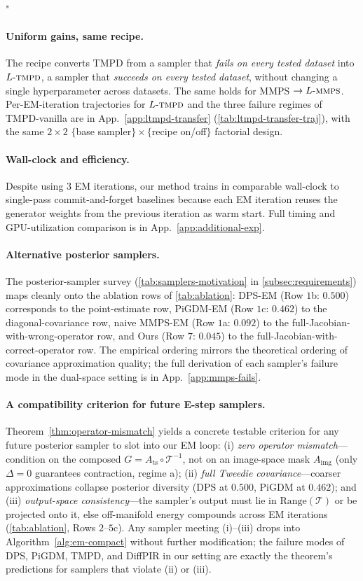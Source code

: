 "\documentclass{article}
\theoremstyle{plain}
\theoremstyle{definition}
\theoremstyle{remark}
\newcommand{\tsimg}{\mathcal{T}}
\newcommand{\imgts}{\mathcal{T}^{-1}}
\newcommand{\lmmps}{L\mbox{-}\textsc{mmps}}
\newcommand{\ltmpd}{L\mbox{-}\textsc{tmpd}}
\newcommand{\Ats}{A_{\mathrm{ts}}}
\newcommand{\Aimg}{A_{\mathrm{img}}}
\begin{document}
\paragraph{Uniform gains, same recipe.}
The recipe converts TMPD from a sampler that \emph{fails on every tested dataset} into $\ltmpd$, a sampler that \emph{succeeds on every tested dataset}, without changing a single hyperparameter across datasets. The same holds for MMPS $\to \lmmps$. Per-EM-iteration trajectories for $\ltmpd$ and the three failure regimes of TMPD-vanilla are in App.~\ref{app:ltmpd-transfer} (\cref{tab:ltmpd-transfer-traj}), with the same $2{\times}2$ $\{$base sampler$\}\times\{$recipe on/off$\}$ factorial design.

\paragraph{Wall-clock and efficiency.}
Despite using $3$ EM iterations, our method trains in comparable wall-clock to single-pass commit-and-forget baselines because each EM iteration reuses the generator weights from the previous iteration as warm start. Full timing and GPU-utilization comparison is in App.~\ref{app:additional-exp}.

\vspace{-1mm}
\paragraph{Alternative posterior samplers.}
The posterior-sampler survey (\cref{tab:samplers-motivation} in \cref{subsec:requirements}) maps cleanly onto the ablation rows of \cref{tab:ablation}: DPS-EM (Row $1$b: $0.500$) corresponds to the point-estimate row, PiGDM-EM (Row $1$c: $0.462$) to the diagonal-covariance row, naive MMPS-EM (Row $1$a: $0.092$) to the full-Jacobian-with-wrong-operator row, and Ours (Row $7$: $0.045$) to the full-Jacobian-with-correct-operator row. The empirical ordering mirrors the theoretical ordering of covariance approximation quality; the full derivation of each sampler's failure mode in the dual-space setting is in App.~\ref{app:mmps-fails}.

\paragraph{A compatibility criterion for future E-step samplers.}
Theorem~\ref{thm:operator-mismatch} yields a concrete testable criterion for any future posterior sampler to slot into our EM loop: (i) \emph{zero operator mismatch}---condition on the composed $G = \Ats \circ \imgts$, not on an image-space mask $\Aimg$ (only $\Delta = 0$ guarantees contraction, regime a); (ii) \emph{full Tweedie covariance}---coarser approximations collapse posterior diversity (DPS at $0.500$, PiGDM at $0.462$); and (iii) \emph{output-space consistency}---the sampler's output must lie in $\mathrm{Range}(\tsimg)$ or be projected onto it, else off-manifold energy compounds across EM iterations (\cref{tab:ablation}, Rows $2$--$5$c). Any sampler meeting (i)--(iii) drops into Algorithm~\ref{alg:em-compact} without further modification; the failure modes of DPS, PiGDM, TMPD, and DiffPIR in our setting are exactly the theorem's predictions for samplers that violate (ii) or (iii).
\end{document}
